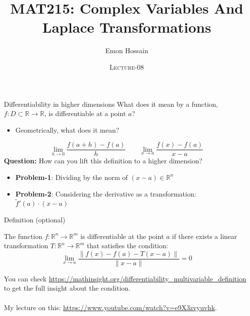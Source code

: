 \documentclass[11pt]{beamer}
\author[] %
{Emon Hossain\inst{1}}
\institute[University of Dhaka] %
{
  \inst{1}%
  Lecturer\\MNS department\\Brac University
}
\date[] %
{\textsc{Lecture-08}}
\title[]{MAT215: Complex Variables And Laplace Transformations}
\theoremstyle{plain}
\begin{document}
\begin{frame}
\titlepage
\end{frame}

\begin{frame}{Differentiability in higher dimensions}
    What does it mean by a function, $f:D\subset\mathbb R\rightarrow\mathbb R$, is differentiable at a point $a$? 
    \begin{itemize}
        \item Geometrically, what does it mean?
    \end{itemize}
    $$\boxed{\lim_{h\rightarrow 0}\frac{f(a+h)-f(a)}{h}}\qquad\boxed{\lim_{x\rightarrow a}\frac{f(x)-f(a)}{x-a}}$$
    \textbf{Question:} How can you lift this definition to a higher dimension? 
    \pause
    \begin{itemize}
        \item \textbf{Problem-1}: Dividing by the norm of $(x-a)\in\mathbb R^n$
        \item \textbf{Problem-2}: Considering the derivative as a transformation: $\tilde{f}'(a)\cdot(x-a)$ 
    \end{itemize}
\end{frame}
\begin{frame}{Definition (optional)}
    \begin{definition}
        The function $f:\mathbb R^n\rightarrow\mathbb R^m$ is differentiable at the point $a$ if there exists a linear transformation $T:\mathbb R^n\rightarrow\mathbb R^m$  that satisfies the condition:
        $$
        \boxed{\lim_{x\rightarrow a}\frac{\|f(x)-f(a)-T(x-a)\|}{\|x-a\|}=0}
        $$
    \end{definition}
    You can check \url{https://mathinsight.org/differentiability_multivariable_definition} to get the full insight about the condition.\\~\\
    My lecture on this: \url{https://www.youtube.com/watch?v=e9X3zvyuvhk}. 
\end{frame}
\end{document}
